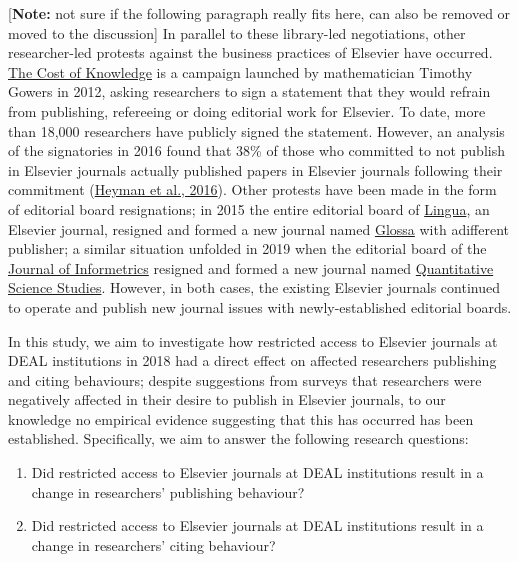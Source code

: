 \documentclass[
]{article}
\providecommand{\tightlist}{%
  \setlength{\itemsep}{0pt}\setlength{\parskip}{0pt}}
\begin{document}
{[}\textbf{Note:} not sure if the following paragraph really fits here, can also be removed or moved to the discussion{]}
In parallel to these library-led negotiations, other researcher-led protests against the business practices of Elsevier have occurred. \href{http://thecostofknowledge.com/}{The Cost of Knowledge} is a campaign launched by mathematician Timothy Gowers in 2012, asking researchers to sign a statement that they would refrain from publishing, refereeing or doing editorial work for Elsevier. To date, more than 18,000 researchers have publicly signed the statement. However, an analysis of the signatories in 2016 found that 38\% of those who committed to not publish in Elsevier journals actually published papers in Elsevier journals following their commitment (\href{https://doi.org/10.3389/frma.2016.00007}{Heyman et al., 2016}). Other protests have been made in the form of editorial board resignations; in 2015 the entire editorial board of \href{https://www.journals.elsevier.com/lingua}{Lingua}, an Elsevier journal, resigned and formed a new journal named \href{https://www.glossa-journal.org/}{Glossa} with adifferent publisher; a similar situation unfolded in 2019 when the editorial board of the \href{https://www.journals.elsevier.com/journal-of-informetrics}{Journal of Informetrics} resigned and formed a new journal named \href{https://direct.mit.edu/qss}{Quantitative Science Studies}. However, in both cases, the existing Elsevier journals continued to operate and publish new journal issues with newly-established editorial boards.

In this study, we aim to investigate how restricted access to Elsevier journals at DEAL institutions in 2018 had a direct effect on affected researchers publishing and citing behaviours; despite suggestions from surveys that researchers were negatively affected in their desire to publish in Elsevier journals, to our knowledge no empirical evidence suggesting that this has occurred has been established. Specifically, we aim to answer the following research questions:

\begin{enumerate}
\def\labelenumi{\arabic{enumi}.}
\tightlist
\item
  Did restricted access to Elsevier journals at DEAL institutions result in a change in researchers' publishing behaviour?
\item
  Did restricted access to Elsevier journals at DEAL institutions result in a change in researchers' citing behaviour?
\end{enumerate}
\end{document}

